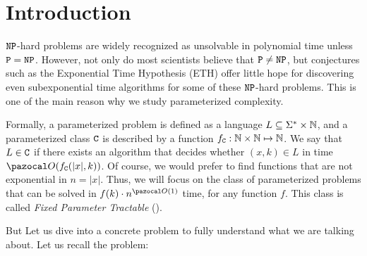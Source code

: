 \section{Introduction}
\label{section:introduction}

$\texttt{NP}$-hard problems are widely recognized as unsolvable in polynomial time unless $\texttt{P} = \texttt{NP}$. However, not only do most scientists believe that $\texttt{P} \neq \texttt{NP}$, but conjectures such as the Exponential Time Hypothesis (ETH) \cite{impagliazzo2001complexity} offer little hope for discovering even subexponential time algorithms for some of these $\texttt{NP}$-hard problems. This is one of the main reason why we study parameterized complexity.

Formally, a parameterized problem is defined as a language $L \subseteq \Sigma^* \times \mathbb{N}$, and a parameterized class $\texttt{C}$ is described by a function $f_{\texttt{C}} : \mathbb{N} \times \mathbb{N} \mapsto \mathbb{N}$. We say that $L \in \texttt{C}$ if there exists an algorithm that decides whether $(x, k) \in L$ in time $\O(f_{\CC{C}}(|x|, k))$. Of course, we would prefer to find functions that are not exponential in $n = |x|$. Thus, we will focus on the class of parameterized problems that can be solved in $f(k)\cdot n^{\O(1)}$ time, for any function $f$. This class is called \textit{Fixed Parameter Tractable} ().

\medskip

But Let us dive into a concrete problem to fully understand what we are talking about. Let us recall the  problem:

\begin{problem}
\end{problem}

